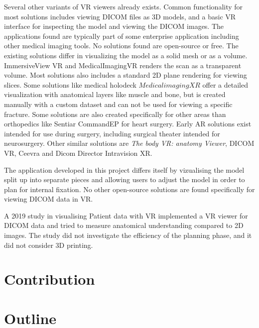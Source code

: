 \documentclass[a4paper]{report}
\begin{document}
Several other variants of VR viewers already exists. Common functionality for most solutions includes viewing DICOM files as 3D models, and a basic VR interface for inspecting the model and viewing the DICOM images. The applications found are typically part of some enterprise application including other medical imaging tools. No solutions found are open-source or free.
The existing solutions differ in visualizing the model as a solid mesh or as a volume. ImmersiveView VR\cite{noauthor_immersiveview_nodate} and MedicalImagingVR\cite{noauthor_medicalimagingvr_nodate} renders the scan as a transparent volume. Most solutions also includes a standard 2D plane rendering for viewing slices.
Some solutions like medical holodeck\cite{medical_holodeck_medicalholodeck_nodate} $Medical imaging XR$ offer a detailed visualization with anatomical layers like muscle and bone, but is created manually with a custom dataset and can not be used for viewing a specific fracture.
Some solutions are also created specifically for other areas than orthopedics like Sentiar CommandEP\cite{noauthor_commandep_nodate} for heart surgery.
Early AR solutions exist intended for use during surgery, including surgical theater\cite{noauthor_virtual_nodate} intended for neurosurgery\cite{anthony_patient-specific_2021}.
Other similar solutions are \emph{The body VR: anatomy Viewer}\cite{noauthor_body_nodate}, DICOM VR\cite{noauthor_dicom_nodate-1}, Ceevra\cite{ceevra_inc_using_2019} and Dicom Director Intravision XR\cite{dicomdirectorcom_surgeons_nodate}.

The application developed in this project differs itself by vizualising the model split up into separate pieces and allowing users to adjust the model in order to plan for internal fixation.
No other open-source solutions are found specifically for viewing DICOM data in VR.

A 2019 study in visualising Patient data with VR\cite{vertemati_virtual_2019} implemented a VR viewer for DICOM data and tried to measure anatomical understanding compared to 2D images. The study did not investigate the efficiency of the planning phase, and it did not consider 3D printing.

\section{Contribution}
\section{Outline}
\end{document}
